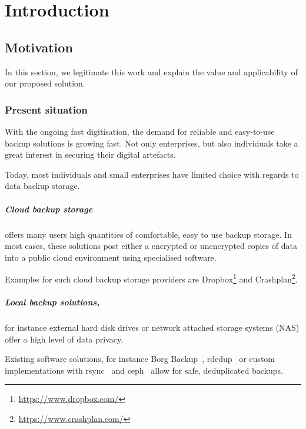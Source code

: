 \chapter{Introduction}
\label{sec:introduction}

\section{Motivation}
In this section, we legitimate this work and explain the value and applicability of our proposed solution.

\subsection{Present situation}
With the ongoing fast digitisation, the demand for reliable and easy-to-use backup solutions is growing fast. Not only enterprises, but also individuals take a great interest in securing their digital artefacts.

Today, most individuals and small enterprises have limited choice with regards to data backup storage.

\paragraph{Cloud backup storage} offers many users high quantities of comfortable, easy to use backup storage. In most cases, these solutions post either a encrypted or unencrypted copies of data into a public cloud environment using specialised software.

Examples for such cloud backup storage providers are Dropbox\footnote{\url{https://www.dropbox.com/}} and Crashplan\footnote{\url{https://www.crashplan.com/}}.

\paragraph{Local backup solutions,} for instance external hard disk drives or network attached storage systems (NAS) offer a high level of data privacy. 

Existing software solutions, for instance Borg Backup~\cite{borg-backup}, rdedup~\cite{rdedup} or custom implementations with rsync~\cite{rsync} and ceph~\cite{ceph} allow for safe, deduplicated backups.


